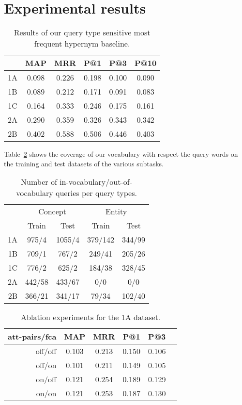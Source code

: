 \documentclass[11pt,a4paper]{article}
\begin{document}

\section{Experimental results}

\begin{table}
	\centering
	\begin{tabular}{c|ccccc}
		   &  MAP  &  MRR  &  P@1  &  P@3  & P@10  \\ \hline
		1A & 0.098 & 0.226 & 0.198 & 0.100 & 0.090 \\
		1B & 0.089 & 0.212 & 0.171 & 0.091 & 0.083 \\
		1C & 0.164 & 0.333 & 0.246 & 0.175 & 0.161 \\
		2A & 0.290 & 0.359 & 0.326 & 0.343 & 0.342 \\
		2B & 0.402 & 0.588 & 0.506 & 0.446 & 0.403 \\
	\end{tabular}
	\label{table:MFH}
	\caption{Results of our query type sensitive most frequent hypernym baseline.}
\end{table}

Table~\ref{table:coverage} shows the coverage of our vocabulary with respect the query words on the training and test datasets of the various subtasks.

\begin{table}
	\centering
	\begin{tabular}{r|cc|cc}
		& \multicolumn{2}{c|}{Concept} & \multicolumn{2}{c}{Entity} \\
		& Train & Test   & Train & Test \\ \hline
	1A  & 975/4 & 1055/4 & 379/142 & 344/99 \\
	1B  & 709/1 & 767/2  & 249/41  & 205/26 \\
	1C  & 776/2 & 625/2  & 184/38  & 328/45 \\
	2A  & 442/58& 433/67 & 0/0     & 0/0    \\
	2B  & 366/21& 341/17 & 79/34   & 102/40 \\
	\end{tabular}
\caption{Number of in-vocabulary/out-of-vocabulary queries per query types.}
\label{table:coverage}
\end{table}


\begin{table}
	\centering
	\begin{tabular}{r|ccccc}
att-pairs/fca & MAP & MRR & P@1 & P@3 \\ \hline
off/off & 0.103 & 0.213 & 0.150 & 0.106 \\
off/on  & 0.101 & 0.211 & 0.149 & 0.105 \\
on/off  & 0.121 & 0.254 & 0.189 & 0.129 \\
on/on   & 0.121 & 0.253 & 0.187 & 0.130 \\
	\end{tabular}
\caption{Ablation experiments for the 1A dataset.}
\label{table:ablation1A}
\end{table}
\end{document}
